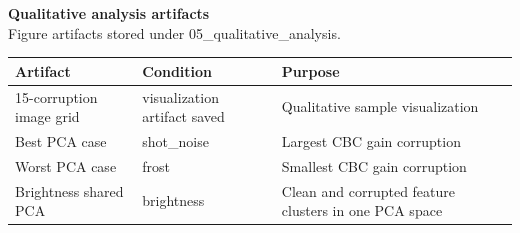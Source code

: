 \documentclass[11pt]{article}
\begin{document}
\clearpage
\begin{center}
{\Large\bfseries Qualitative analysis artifacts}\\[-0.5mm]
{\normalsize Figure artifacts stored under 05\_qualitative\_analysis.}
\end{center}
\vspace{1mm}
{\scriptsize
\begin{tabular}{lll}
\toprule
Artifact & Condition & Purpose \\
\midrule
15-corruption image grid & visualization artifact saved & Qualitative sample visualization \\
Best PCA case & shot\_noise & Largest CBC gain corruption \\
Worst PCA case & frost & Smallest CBC gain corruption \\
Brightness shared PCA & brightness & Clean and corrupted feature clusters in one PCA space \\
\bottomrule
\end{tabular}
}
\end{document}

